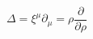 \begin{equation}
\Delta=\xi^{\mu} \partial_{\mu} = \rho \frac{\partial}{\partial \rho}
\end{equation}

